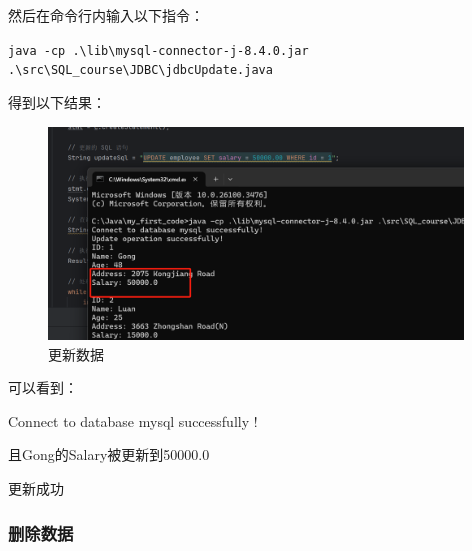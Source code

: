 \documentclass{article}
\begin{document}
	然后在命令行内输入以下指令：
	
	\verb|java -cp .\lib\mysql-connector-j-8.4.0.jar .\src\SQL_course\JDBC\jdbcUpdate.java|
	
	得到以下结果：
	
	\begin{figure}[H]
		\centering
		\includegraphics[width=11cm]{./images/11.更新数据.png}
		\caption{更新数据}
	\end{figure}
	
	可以看到：
	
	Connect to database mysql successfully !
	
	且Gong的Salary被更新到50000.0
	
	更新成功
	
	\subsubsection{删除数据}
	
\end{document}
